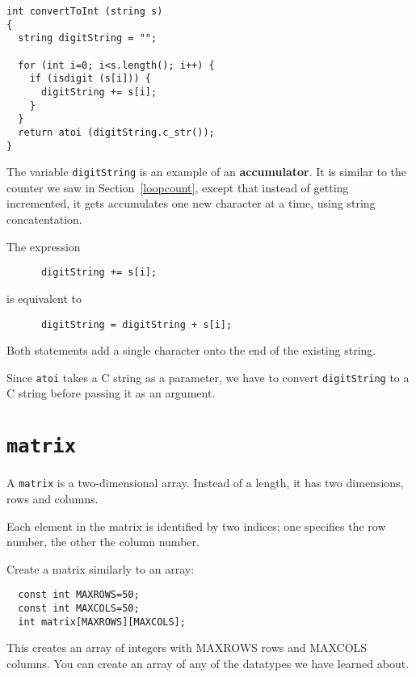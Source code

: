 \begin{lstlisting}
int convertToInt (string s)
{
  string digitString = "";

  for (int i=0; i<s.length(); i++) {
    if (isdigit (s[i])) {
      digitString += s[i];
    }
  }
  return atoi (digitString.c_str());
}
\end{lstlisting}
%
The variable {\tt digitString} is an example of an {\bf accumulator}.  It is
similar to the counter we saw in Section~\ref{loopcount},
except that instead of getting incremented, it gets accumulates
one new character at a time, using string concatentation.

The expression

\begin{lstlisting}
      digitString += s[i];
\end{lstlisting}
%
is equivalent to

\begin{lstlisting}
      digitString = digitString + s[i];
\end{lstlisting}
%
Both statements add a single character onto the end of the existing
string.


Since {\tt atoi} takes a C string as a parameter, we have
to convert {\tt digitString} to a C string before passing it
as an argument.


\section {{\tt matrix}}

A {\tt matrix} is a two-dimensional array.  Instead of a length, it has two
dimensions, rows and columns.

Each element in the matrix is identified by two indices;
one specifies the row number, the other the column number.


Create a matrix similarly to an array:

\begin{lstlisting}
  const int MAXROWS=50;
  const int MAXCOLS=50;
  int matrix[MAXROWS][MAXCOLS];
\end{lstlisting}
%
This creates an array of integers with MAXROWS rows and MAXCOLS columns.  You can create an array of any of the datatypes we have learned about.  

